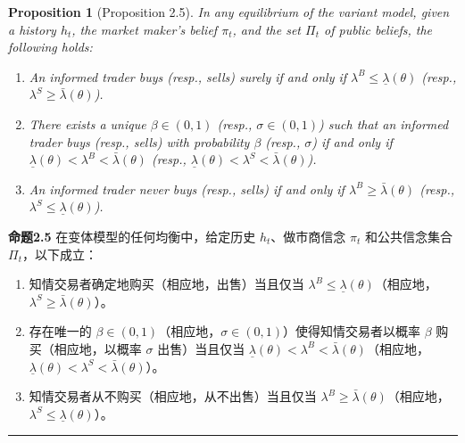 \documentclass[12pt,a4paper]{article}
\newenvironment{translation}{%
  \par\vspace{2pt}\noindent%
  \color{transblue}%
  \ignorespaces
}{%
  \par\vspace{4pt}\hrule\vspace{6pt}%
}
\newtheorem{proposition}[theorem]{Proposition}
\begin{document}
\begin{proposition}[Proposition 2.5]
In any equilibrium of the variant model, given a history $h_t$, the market maker's belief $\pi_t$, and the set $\Pi_t$ of public beliefs, the following holds:
\begin{enumerate}[label=(\roman*)]
\item An informed trader buys (resp., sells) surely if and only if $\lambda^B \leq \underline{\lambda}(\theta)$ (resp., $\lambda^S \geq \bar{\lambda}(\theta)$).
\item There exists a unique $\beta \in (0, 1)$ (resp., $\sigma \in (0, 1)$) such that an informed trader buys (resp., sells) with probability $\beta$ (resp., $\sigma$) if and only if $\underline{\lambda}(\theta) < \lambda^B < \bar{\lambda}(\theta)$ (resp., $\underline{\lambda}(\theta) < \lambda^S < \bar{\lambda}(\theta)$).
\item An informed trader never buys (resp., sells) if and only if $\lambda^B \geq \bar{\lambda}(\theta)$ (resp., $\lambda^S \leq \underline{\lambda}(\theta)$).
\end{enumerate}
\end{proposition}
\begin{translation}
\textbf{命题2.5} 在变体模型的任何均衡中，给定历史 $h_t$、做市商信念 $\pi_t$ 和公共信念集合 $\Pi_t$，以下成立：
\begin{enumerate}[label=(\roman*)]
\item 知情交易者确定地购买（相应地，出售）当且仅当 $\lambda^B \leq \underline{\lambda}(\theta)$（相应地，$\lambda^S \geq \bar{\lambda}(\theta)$）。
\item 存在唯一的 $\beta \in (0, 1)$（相应地，$\sigma \in (0, 1)$）使得知情交易者以概率 $\beta$ 购买（相应地，以概率 $\sigma$ 出售）当且仅当 $\underline{\lambda}(\theta) < \lambda^B < \bar{\lambda}(\theta)$（相应地，$\underline{\lambda}(\theta) < \lambda^S < \bar{\lambda}(\theta)$）。
\item 知情交易者从不购买（相应地，从不出售）当且仅当 $\lambda^B \geq \bar{\lambda}(\theta)$（相应地，$\lambda^S \leq \underline{\lambda}(\theta)$）。
\end{enumerate}
\end{translation}
\end{document}

